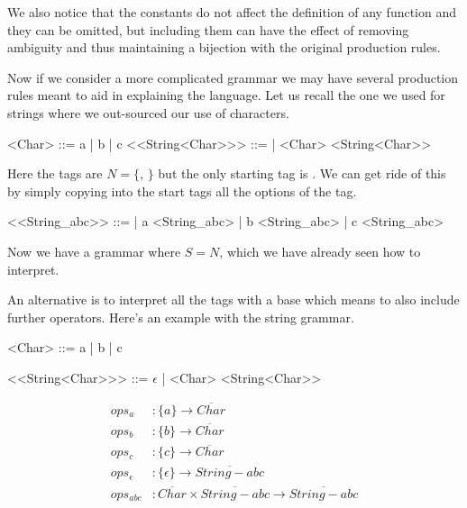 We also notice that 
the constants do not affect the definition of any function and they can be 
omitted, but including them can have the effect of removing ambiguity and thus 
maintaining a bijection with the original production rules.


Now if we consider a more complicated grammar we may have several production rules 
meant to aid in explaining the language.  Let us recall the one we used for strings
where we out-sourced our use of characters.
\begin{center}
\begin{Gcode}[]
<Char> ::= a | b | c 
<<String<Char>>> ::=
                  | <Char> <String<Char>>
\end{Gcode}
\end{center}
Here the tags are $N=\{$, $\}$ but the 
only starting tag is . We can get ride of this by simply 
copying into the start tags all the options of the  tag.
\begin{center}
\begin{Gcode}[]
<<String_abc>> ::= 
                | a <String_abc>
                | b <String_abc>
                | c <String_abc>
\end{Gcode}
\end{center}
Now we have a grammar where $S=N$, which we have already seen how to interpret.

An alternative is to interpret all the tags with a base which means to also 
include further operators.  Here's an example with the string grammar.
\begin{center}
\begin{minipage}{0.4\textwidth}
\begin{Gcode}[]
<Char> ::= a
    | b
    | c 

<<String<Char>>> ::= $\epsilon$
    | <Char> <String<Char>>
\end{Gcode}
\end{minipage}
\hfill 
\begin{minipage}{0.5\textwidth}
\begin{align*}
ops_a &:\{a\}\to \overline{Char}\\
ops_b &:\{b\}\to \overline{Char}\\
ops_c &:\{c\}\to \overline{Char}\\
ops_{\epsilon} & : \{\epsilon\} \to \overline{String-abc}\\
ops_{abc} & : \overline{Char}\times \overline{String-abc} \to \overline{String-abc}
\end{align*}    
\end{minipage}
\end{center}
    

